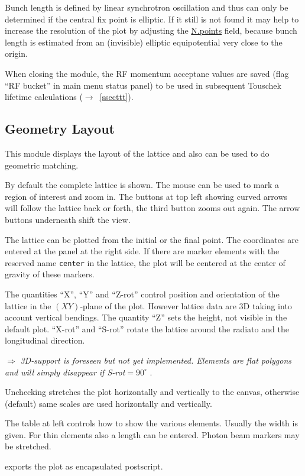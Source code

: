 \documentclass[12pt]{article}
\newcommand{\see}{\mbox{$\rightarrow$~}}
\newcommand\todo[1]{$\Longrightarrow$ {\em #1} }
\newcommand\button[1]{\fbox{\small\bf #1}}
\newcommand\chkbox[1]{\fbox{\small $\circ\,$#1}}
\newcommand\field[1]{\underline{\small #1}}
\begin{document}
Bunch length is defined by linear synchrotron oscillation and thus can only be determined if the central fix point is elliptic. If it still is not found it may help to increase the resolution of the plot by adjusting the \field{N.points} field, because bunch length is estimated from an (invisible) elliptic equipotential very close to the origin.

When closing the module, the RF momentum acceptane values are saved (flag ``RF bucket'' in main menu status panel) to be used in subsequent Touschek lifetime calculations (\see\ref{ssecttt}).


\subsection{Geometry Layout}
This module displays the layout of the lattice and also can be used to do geometric matching.

By default the complete lattice is shown. The mouse can be used to mark a region of interest and zoom in. The buttons at top left showing curved arrows  will follow
the lattice back or forth, the third button zooms out again. The arrow buttons underneath shift the view.

The lattice can be plotted from the initial or the final point. The coordinates are entered at the panel at the right side.
If there are marker elements with the reserved name {\tt center} in the lattice, the plot will be centered at the center of gravity of these markers.

The quantities ``X'', ``Y'' and ``Z-rot'' control position and orientation of the lattice in the $(XY)$-plane of the plot. However lattice data are 3D taking into account vertical bendings. The quantity ``Z'' sets the height, not visible in the default plot. ``X-rot'' and ``S-rot'' rotate the lattice around the radiato and the longitudinal direction.

\todo{3D-support is foreseen but not yet implemented. Elements are flat polygons and will simply disappear if S-rot$=90^{\circ}$}.

Unchecking \chkbox{fix aspect ratio} stretches the plot horizontally and vertically to
the canvas, otherwise (default) same scales are used horizontally and vertically.

The table at left controls how to show the various elements. Usually the width is given. For thin elements also a length can be entered. Photon beam markers may be stretched.


\button{--$>$ eps} exports the plot as encapsulated postscript. 
\end{document}
